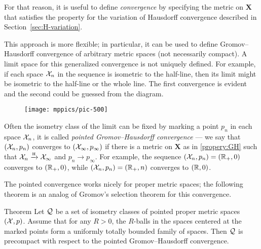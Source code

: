 For that reason, it is useful to define \emph{convergence} by specifying the metric on $\bm{X}$ that satisfies the property
for the variation of Hausdorff convergence described in Section~\ref{sec:H-variation}.

This approach is more flexible;
in particular, it can be used to define Gromov--Hausdorff convergence of arbitrary metric spaces (not necessarily compact).
A limit space for this generalized convergence is not uniquely defined.
For example, if each space $\mathcal{X}_n$ in the sequence is isometric to the half-line, then its limit might be isometric to the half-line or the whole line.
The first convergence is evident and the second could be guessed from the diagram.

\begin{figure}[ht!]
\vskip-0mm
\centering
\texttt{[image: mppics/pic-500]}
\end{figure}

Often the isometry class of the limit can be fixed by marking a point $p_n$ in each space $\mathcal{X}_n$, it is called \emph{pointed Gromov--Hausdorff convergence} --- we say that $(\mathcal{X}_n,p_n)$ converges to $(\mathcal{X}_\infty,p_\infty)$ if there is a metric on $\bm{X}$ as in \ref{propery:GH} such that $\mathcal{X}_n\xrightarrow{\mbox{\tiny\rm H}} \mathcal{X}_\infty$ and $p_n\to p_\infty$.
For example, the sequence $(\mathcal{X}_n,p_n)=(\mathbb{R}_+,0)$ converges to $(\mathbb{R}_+,0)$, while $(\mathcal{X}_n,p_n)=(\mathbb{R}_+,n)$ converges to $(\mathbb{R},0)$.

The pointed convergence works nicely for proper metric spaces;
the following theorem is an analog of Gromov's selection theorem for this convergence.

\begin{thm}{Theorem}\label{thm:pointed-gromov-compactness}%
Let $\mathcal{Q}$ be a set of isometry classes of pointed proper metric spaces
$(\mathcal{X},p)$.
Assume that for any $R>0$, the $R$-balls in the spaces centered at the marked points form a uniformly totally bounded family of spaces.
Then $\mathcal{Q}$ is precompact with respect to the pointed Gromov--Hausdorff convergence. 
\end{thm}
